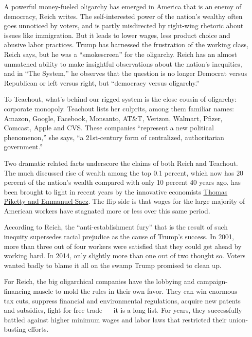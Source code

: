 A powerful money-fueled oligarchy has emerged in America that is an
enemy of democracy, Reich writes. The self-interested power of the
nation's wealthy often goes unnoticed by voters, and is partly
misdirected by right-wing rhetoric about issues like immigration. But it
leads to lower wages, less product choice and abusive labor practices.
Trump has harnessed the frustration of the working class, Reich says,
but he was a ``smokescreen'' for the oligarchy. Reich has an almost
unmatched ability to make insightful observations about the nation's
inequities, and in ``The System,'' he observes that the question is no
longer Democrat versus Republican or left versus right, but ``democracy
versus oligarchy.''

To Teachout, what's behind our rigged system is the close cousin of
oligarchy: corporate monopoly. Teachout lists her culprits, among them
familiar names: Amazon, Google, Facebook, Monsanto, AT\&T, Verizon,
Walmart, Pfizer, Comcast, Apple and CVS. These companies ``represent a
new political phenomenon,'' she says, ``a 21st-century form of
centralized, authoritarian government.''

Two dramatic related facts underscore the claims of both Reich and
Teachout. The much discussed rise of wealth among the top 0.1 percent,
which now has 20 percent of the nation's wealth compared with only 10
percent 40 years ago, has been brought to light in recent years by the
innovative economists \href{https://www.nber.org/papers/w11955}{Thomas
Piketty and Emmanuel Saez}. The flip side is that wages for the large
majority of American workers have stagnated more or less over this same
period.

According to Reich, the ``anti-establishment fury'' that is the result
of such inequity supersedes racial prejudice as the cause of Trump's
success. In 2001, more than three out of four workers were satisfied
that they could get ahead by working hard. In 2014, only slightly more
than one out of two thought so. Voters wanted badly to blame it all on
the swamp Trump promised to clean up.

For Reich, the big oligarchical companies have the lobbying and
campaign-financing muscle to mold the rules in their own favor. They can
win enormous tax cuts, suppress financial and environmental regulations,
acquire new patents and subsidies, fight for free trade --- it is a long
list. For years, they successfully battled against higher minimum wages
and labor laws that restricted their union-busting efforts.

